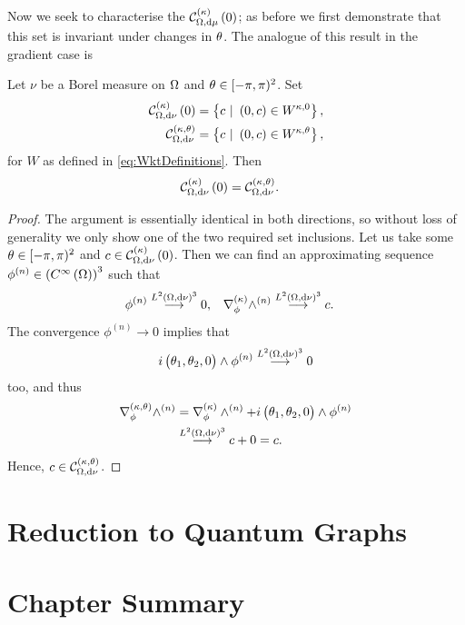 Now we seek to characterise the $\mathcal{C}_{ \Omega, \mathrm{d}\mu}^{(\kappa)}\left( 0 \right)$; as before we first demonstrate that this set is invariant under changes in $\theta$.
The analogue of this result in the gradient case is 
\begin{prop}
	Let $\nu$ be a Borel measure on $\Omega$ and $\theta\in[-\pi,\pi)^2$.
	Set
	\begin{align*}
		\kcurlZero{\ddom}{\nu} &= \clbracs{ c \ \vert \ \bracs{0,c}\in W^{\wavenumber, 0}}, \\
		\mathcal{C}_{\ddom, \md\nu}^{\kt} &= \clbracs{ c \ \vert \ \bracs{0,c}\in W^{\wavenumber, \qm} },
	\end{align*}
	for $W$ as defined in \eqref{eq:WktDefinitions}.
	Then
	\begin{align*}
		\mathcal{C}_{ \Omega, \mathrm{d}\nu}^{(\kappa)}\left( 0 \right) &= \mathcal{C}_{\Omega, \mathrm{d}\nu}^{\left( \kappa, \theta \right)}.
	\end{align*}
\end{prop}
\begin{proof}
	The argument is essentially identical in both directions, so without loss of generality we only show one of the two required set inclusions.
	Let us take some $\theta\in[-\pi,\pi)^2$ and $c\in\mathcal{C}_{ \Omega, \mathrm{d}\nu}^{(\kappa)}\left( 0 \right)$.
	Then we can find an approximating sequence $\phi^{(n)}\in\left( C^{\infty}\left( \Omega \right) \right)^3$ such that
	\begin{align*}
		\phi^{(n)} \overset{L^{2}\left( \Omega,\mathrm{d}\nu \right)^3}{\longrightarrow} 0, &\quad \nabla_{\phi}^{(\kappa)}\wedge^{(n)} \overset{L^{2}\left( \Omega,\mathrm{d}\nu \right)^3}{\longrightarrow} c.
	\end{align*}
	The convergence $\phi^(n)\rightarrow0$ implies that 
	\begin{align*}
		i \begin{pmatrix} \theta_1, \theta_2, 0\end{pmatrix}\wedge\phi^{(n)}\overset{L^{2}\left( \Omega,\mathrm{d}\nu \right)^3}{\longrightarrow} 0
	\end{align*}
	too, and thus
	\begin{align*}
		\nabla_{\phi}^{\left( \kappa, \theta \right)}\wedge^{(n)} &= \nabla_{\phi}^{(\kappa)}\wedge^{(n)} + i\begin{pmatrix} \theta_1, \theta_2, 0\end{pmatrix}\wedge\phi^{(n)} \\
		&\overset{L^{2}\left( \Omega,\mathrm{d}\nu \right)^3}{\longrightarrow} c + 0 = c.
	\end{align*}
	Hence, $c\in \mathcal{C}_{\Omega, \mathrm{d}\nu}^{\left( \kappa, \theta \right)}$.
\end{proof}

\section{Reduction to Quantum Graphs} \label{sec:CurlReductionToQG}

\section{Chapter Summary} \label{sec:CurlSummary}